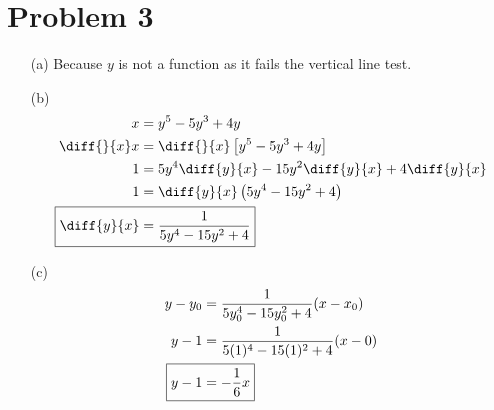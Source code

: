\documentclass{article}
\begin{document}
\section*{Problem 3}
\begin{itemize}
\item[(a)]
	Because $y$ is not a function as it fails the vertical line test.

\item[(b)]
	\setlength{\abovedisplayskip}{0pt}
	\begin{align*}
		x&=y^5-5y^3+4y \\
		\diff{}{x}x&=\diff{}{x}\left[y^5-5y^3+4y\right] \\
		1&=5y^4\diff{y}{x}-15y^2\diff{y}{x}+4\diff{y}{x} \\
		1&=\diff{y}{x}\left(5y^4-15y^2+4\right) \\
		\Aboxed{\diff{y}{x}&=\frac{1}{5y^4-15y^2+4}}
	\end{align*}

\item[(c)]
	\setlength{\abovedisplayskip}{0pt}
	\begin{align*}
		y-y_0&=\frac{1}{5y_0^4-15y_0^2+4}(x-x_0) \\
		y-1&=\frac{1}{5(1)^4-15(1)^2+4}(x-0) \\
		\Aboxed{y-1&=-\frac{1}{6}x} \\
	\end{align*}
\end{itemize}
\end{document}
